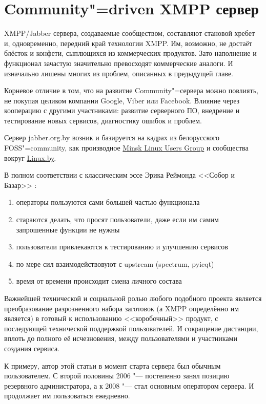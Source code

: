 \documentclass[10pt, a5paper]{article}
\begin{document}
\section*{Community"=driven XMPP сервер}

XMPP/Jabber сервера, создаваемые сообществом, составляют становой хребет и, одновременно, передний край технологии XMPP. Им, возможно, не достаёт блёсток и конфети, сыплющихся из коммерческих продуктов. Зато наполнение и функционал зачастую значительно превосходят коммерческие аналоги. И изначально лишены многих из проблем, описанных в предыдущей главе.

Корневое отличие в том, что на развитие Community"=сервера можно повлиять, не покупая целиком компании Google, Viber или Facebook. Влияние через кооперацию с другими участниками: развитие серверного ПО, внедрение и тестирование новых сервисов, диагностику ошибок и проблем.

Сервер jabber.org.by возник и базируется на кадрах из белорусского FOSS"=community, как производное \href{http://mlug.linux.by}{Minsk Linux Users Group}  и сообщества вокруг \href{http://forum.linux.by}{Linux.by}.

В полном соответствии с классическим эссе Эрика Реймонда <<Собор и Базар>> \cite{Mendoza2}:

\begin{enumerate}
  \item операторы пользуются сами большей частью функционала
  \item стараются делать, что просят пользователи, даже если им самим запрошенные функции не нужны
  \item пользователи привлекаются к тестированию и улучшению  сервисов
  \item по мере сил взаимодействовуют с upstream (spectrum, pyicqt)
  \item время от времени происходит смена личного состава
\end{enumerate}

Важнейшей технической и социальной ролью любого подобного проекта является преобразование разрозненного набора заготовок (а XMPP определённо им является) в готовый к использованию <<коробочный>> продукт, с последующей технической поддержкой пользователей. И сокращение дистанции, вплоть до полного её исчезновения, между пользователями и участниками создания сервиса.

К примеру, автор этой статьи в момент старта сервера был обычным пользователем. С второй половины 2006 "--- постепенно занял позицию резервного администратора, а к 2008 "--- стал основным оператором сервера. И продолжает им пользоваться ежедневно.
\end{document}
